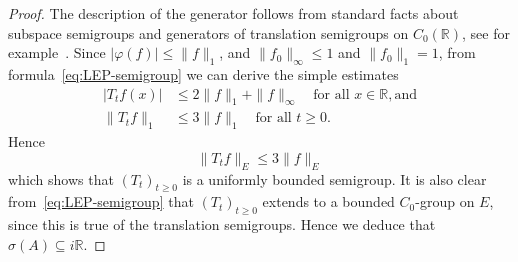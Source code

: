 \documentclass[a4paper, reqno]{amsart}
\numberwithin{equation}{section}
\theoremstyle{plain}
\theoremstyle{definition}
\theoremstyle{remark}
\newcommand{\RR}{\mathbb{R}}
\begin{document}
\begin{proof}
	The description of the generator follows from standard facts about subspace semigroups and generators of translation semigroups on $C_0(\RR)$, see for example~\cite[Chapter II, 2.2.3 \& 2.2.10]{EN00}. Since $|\varphi(f)| \le \|f\|_1$, and $\|f_0\|_\infty \le 1$ and $\|f_0\|_1 = 1$, from formula~\eqref{eq:LEP-semigroup} we can derive the simple estimates
	\begin{align*}
		|T_tf(x)| &\le 2\|f\|_1 + \|f\|_\infty \quad\text{for all }x \in \RR, \text{and} \\
		\|T_t f\|_1 &\le 3\|f\|_1 \quad\text{for all } t \ge 0.
	\end{align*}
	Hence
	\begin{equation*}
		\|T_t f\|_E \le 3\|f\|_E
	\end{equation*}
	which shows that $(T_t)_{t\ge 0}$ is a uniformly bounded semigroup. It is also clear from~\eqref{eq:LEP-semigroup} that $(T_t)_{t\ge 0}$ extends to a bounded $C_0$-group on $E$, since this is true of the translation semigroups. Hence we deduce that $\sigma(A) \subseteq i\RR$.
	

\end{proof}
\end{document}
